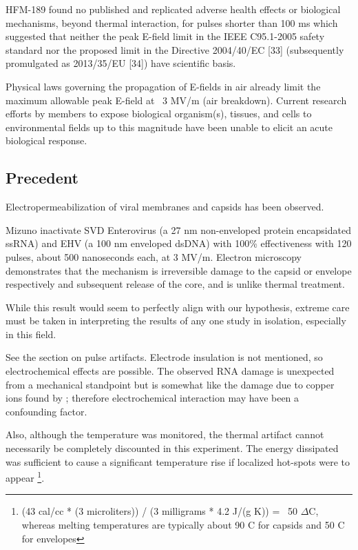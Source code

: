 \documentclass[paper.tex]{subfiles}
\begin{document}
\begin{multicols}{1}
\begin{fquote}
	HFM-189 found no published and replicated adverse health effects or biological mechanisms, beyond
	thermal interaction, for pulses shorter than 100 ms which suggested that neither the peak E-field limit in the
	IEEE C95.1-2005 safety standard {} nor the proposed limit in the Directive 2004/40/EC [33] (subsequently promulgated as 2013/35/EU [34]) have scientific basis. 
	
	Physical laws governing the propagation of E-fields in air already limit the maximum allowable peak E-field at ~3 MV/m (air breakdown). Current research efforts by members to expose biological organism(s), tissues, and cells to environmental
	fields up to this magnitude have been unable to elicit an acute biological response.
\end{fquote}

\subsection{Precedent}

Electropermeabilization of viral membranes and capsids has been observed.

Mizuno \cite{Inactivation1990} inactivate SVD Enterovirus (a 27 nm non-enveloped protein encapsidated ssRNA) and EHV (a 100 nm enveloped dsDNA) with 100\% effectiveness with 120 pulses, about 500 nanoseconds each, at 3 MV/m. Electron microscopy demonstrates that the mechanism is irreversible damage to the capsid or envelope respectively and subsequent release of the core, and is unlike thermal treatment.

While this result would seem to perfectly align with our hypothesis, extreme care must be taken in interpreting the results of any one study in isolation, especially in this field. 

See the section on pulse artifacts. Electrode insulation is not mentioned, so electrochemical effects are possible. The observed RNA damage is unexpected from a mechanical standpoint but is somewhat like the damage due to copper ions found by \cite{Microwave1987}; therefore electrochemical interaction may have been a confounding factor.

Also, although the temperature was monitored, the thermal artifact cannot necessarily be completely discounted in this experiment. The energy dissipated was sufficient to cause a significant temperature rise if localized hot-spots were to appear \footnote{(43 cal/cc * (3 microliters)) / (3 milligrams * 4.2 J/(g K)) = ~50 $\Delta$C, whereas melting temperatures are typically about 90 C for capsids \cite{Thermal1999} and 50 C for envelopes\cite{Stability1985}}.



\end{multicols}
\end{document}

